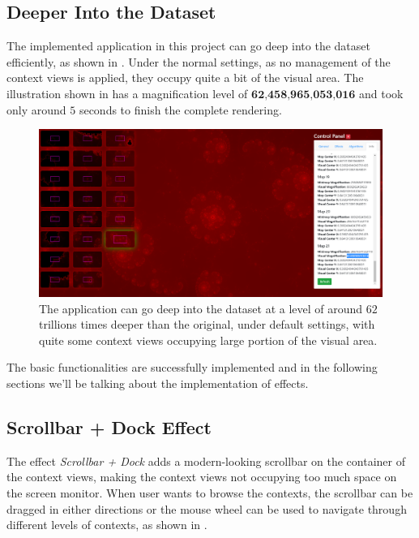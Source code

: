 \subsection{Deeper Into the Dataset}

The implemented application in this project can go deep into the dataset efficiently, as shown in . Under the normal settings, as no management of the context views is applied, they occupy quite a bit of the visual area. The illustration shown in  has a magnification level of $\textbf{62,458,965,053,016}$ and took only around $5$ seconds to finish the complete rendering.

\begin{figure}[H]
\centering
\includegraphics[width=\textwidth,keepaspectratio]{Figures/Chapter5/deep.png}
\decoRule
\caption[Zooming Deep Into the Dataset]{The application can go deep into the dataset at a level of around $62$ trillions times deeper than the original, under default settings, with quite some context views occupying large portion of the visual area.}
\label{fig:chap5:deep}
\end{figure}

The basic functionalities are successfully implemented and in the following sections we'll be talking about the implementation of effects.

\subsection{Scrollbar + Dock Effect}
\label{chap5:scrollbar}

The effect \emph{Scrollbar + Dock} adds a modern-looking scrollbar on the container of the context views, making the context views not occupying too much space on the screen monitor. When user wants to browse the contexts, the scrollbar can be dragged in either directions or the mouse wheel can be used to navigate through different levels of contexts, as shown in .

